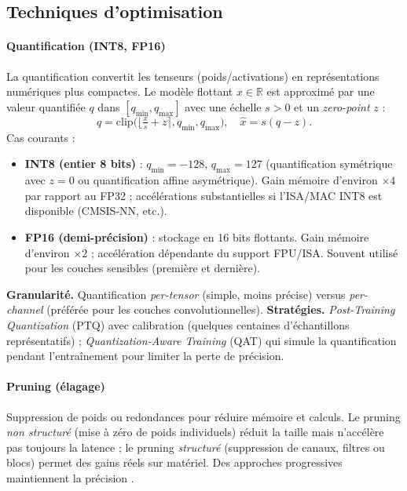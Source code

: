 \subsection{Techniques d’optimisation}
\paragraph{Quantification (INT8, FP16)}\label{subsec:quant}  
La quantification convertit les tenseurs (poids/activations) en représentations numériques plus compactes. Le modèle flottant \( x \in \mathbb{R} \) est approximé par une valeur quantifiée \( q \) dans \([q_{\min}, q_{\max}]\) avec une échelle \( s > 0 \) et un \emph{zero-point} \( z \) :
\begin{equation}
    \label{eq:affine_quant}
    q = \mathrm{clip}\Big(\big\lfloor \tfrac{x}{s} + z \big\rceil, q_{\min}, q_{\max}\Big), \quad \hat{x} = s(q - z).
\end{equation}
Cas courants :
\begin{itemize}
    \item \textbf{INT8 (entier 8 bits)} : \(q_{\min} = -128\), \(q_{\max} = 127\) (quantification symétrique avec \(z=0\) ou quantification affine asymétrique). Gain mémoire d’environ \(\times 4\) par rapport au FP32 ; accélérations substantielles si l’ISA/MAC INT8 est disponible (CMSIS-NN, etc.).
    \item \textbf{FP16 (demi-précision)} : stockage en 16 bits flottants. Gain mémoire d’environ \(\times 2\) ; accélération dépendante du support FPU/ISA. Souvent utilisé pour les couches sensibles (première et dernière).
\end{itemize}  
\textbf{Granularité.} Quantification \emph{per-tensor} (simple, moins précise) versus \emph{per-channel} (préférée pour les couches convolutionnelles).  
\textbf{Stratégies.} \emph{Post-Training Quantization} (PTQ) avec calibration (quelques centaines d’échantillons représentatifs) ; \emph{Quantization-Aware Training} (QAT) qui simule la quantification pendant l’entraînement pour limiter la perte de précision.

\paragraph{Pruning (élagage)}  
Suppression de poids ou redondances pour réduire mémoire et calculs. Le pruning \emph{non structuré} (mise à zéro de poids individuels) réduit la taille mais n’accélère pas toujours la latence ; le pruning \emph{structuré} (suppression de canaux, filtres ou blocs) permet des gains réels sur matériel. Des approches progressives maintiennent la précision \cite{han2016deep}.


